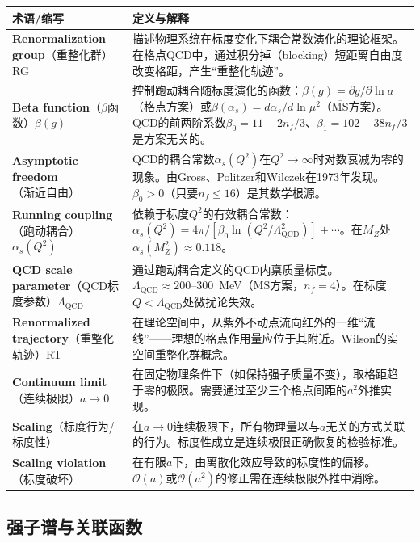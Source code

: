 \documentclass[12pt,a4paper]{ctexart}
\begin{document}
\begin{longtable}{p{3.5cm}p{9cm}}
\toprule
\textbf{术语/缩写} & \textbf{定义与解释} \\
\midrule
\endhead
\textbf{Renormalization group}（重整化群）RG& 描述物理系统在标度变化下耦合常数演化的理论框架。在格点QCD中，通过积分掉（blocking）短距离自由度改变格距，产生``重整化轨迹''。\\
\textbf{Beta function}（$\beta$函数）$\beta(g)$& 控制跑动耦合随标度演化的函数：$\beta(g) = \partial g / \partial\ln a$（格点方案）或$\beta(\alpha_s) = d\alpha_s / d\ln\mu^2$（$\overline{\text{MS}}$方案）。QCD的前两阶系数$\beta_0 = 11 - 2n_f/3$、$\beta_1 = 102 - 38n_f/3$是方案无关的。\\
\textbf{Asymptotic freedom}（渐近自由）& QCD的耦合常数$\alpha_s(Q^2)$在$Q^2\to\infty$时对数衰减为零的现象。由Gross、Politzer和Wilczek在1973年发现。$\beta_0>0$（只要$n_f \le 16$）是其数学根源。\\
\textbf{Running coupling}（跑动耦合）$\alpha_s(Q^2)$& 依赖于标度$Q^2$的有效耦合常数：$\alpha_s(Q^2) = 4\pi/[\beta_0 \ln(Q^2/\Lambda_{\text{QCD}}^2)] + \cdots$。在$M_Z$处$\alpha_s(M_Z^2) \approx 0.118$。\\
\textbf{QCD scale parameter}（QCD标度参数）$\Lambda_{\text{QCD}}$& 通过跑动耦合定义的QCD内禀质量标度。$\Lambda_{\text{QCD}} \approx 200\text{--}300$~MeV（$\overline{\text{MS}}$方案，$n_f=4$）。在标度$Q < \Lambda_{\text{QCD}}$处微扰论失效。\\
\textbf{Renormalized trajectory}（重整化轨迹）RT& 在理论空间中，从紫外不动点流向红外的一维``流线''——理想的格点作用量应位于其附近。Wilson的实空间重整化群概念。\\
\textbf{Continuum limit}（连续极限）$a\to 0$& 在固定物理条件下（如保持强子质量不变），取格距趋于零的极限。需要通过至少三个格点间距的$a^2$外推实现。\\
\textbf{Scaling}（标度行为/标度性）& 在$a\to 0$连续极限下，所有物理量以与$a$无关的方式关联的行为。标度性成立是连续极限正确恢复的检验标准。\\
\textbf{Scaling violation}（标度破坏）& 在有限$a$下，由离散化效应导致的标度性的偏移。$\mathcal{O}(a)$或$\mathcal{O}(a^2)$的修正需在连续极限外推中消除。\\
\bottomrule
\end{longtable}

\subsection*{强子谱与关联函数}
\end{document}
